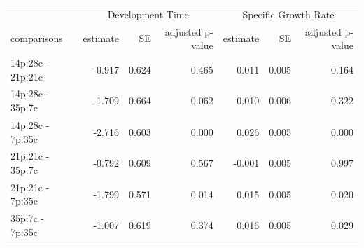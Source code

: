\documentclass[
]{article}
\begin{document}
\begin{tbl}

\begin{minipage}{\linewidth}

\begingroup
\fontsize{12.0pt}{14.4pt}\selectfont
\begin{longtable*}{lrrrrrr}
\toprule
 &  &  \\ 
\cmidrule(lr){2-4} \cmidrule(lr){5-7}
comparisons & estimate & SE & adjusted p-value & estimate & SE & adjusted p-value \\ 
\midrule\addlinespace[2.5pt]
14p:28c - 21p:21c & -0.917 & 0.624 & 0.465 & 0.011 & 0.005 & 0.164 \\ 
14p:28c - 35p:7c & -1.709 & 0.664 & 0.062 & 0.010 & 0.006 & 0.322 \\ 
14p:28c - 7p:35c & -2.716 & 0.603 & 0.000 & 0.026 & 0.005 & 0.000 \\ 
21p:21c - 35p:7c & -0.792 & 0.609 & 0.567 & -0.001 & 0.005 & 0.997 \\ 
21p:21c - 7p:35c & -1.799 & 0.571 & 0.014 & 0.015 & 0.005 & 0.020 \\ 
35p:7c - 7p:35c & -1.007 & 0.619 & 0.374 & 0.016 & 0.005 & 0.029 \\ 
\bottomrule
\end{longtable*}
\endgroup

\end{minipage}%

\caption{\label{tbl-field-population-no-choice-experiment-phys-post-hoc}Posthoc
comparisons for diet treatments for C. terminifera individual specific
growth rate and development time. SE = standard error.}

\end{tbl}%
\end{document}
